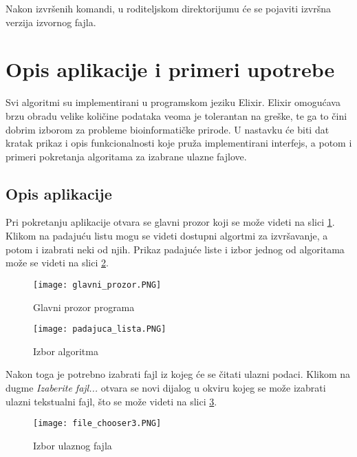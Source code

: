 \documentclass[12pt,oneside]{memoir}
\begin{document}
\noindent Nakon izvršenih komandi, u roditeljskom direktorijumu će se pojaviti izvršna verzija izvornog fajla.




\section{Opis aplikacije i primeri upotrebe}

Svi algoritmi su implementirani u programskom jeziku Elixir. Elixir omogućava brzu obradu velike količine podataka veoma je tolerantan na greške, te ga to čini dobrim izborom za probleme bioinformatičke prirode. U nastavku će biti dat kratak prikaz i opis funkcionalnosti koje pruža implementirani interfejs, a potom i primeri pokretanja algoritama za izabrane ulazne fajlove.

\subsection{Opis aplikacije}

Pri pokretanju aplikacije otvara se glavni prozor koji se može videti na slici \ref{fig:glavniProzor}. Klikom na padajuću listu mogu se videti dostupni algortmi za izvršavanje, a potom i izabrati neki od njih. Prikaz padajuće liste i izbor jednog od algoritama može se videti na slici \ref{fig:padajucaLista}. 

\begin{figure}[h]
\centering
\texttt{[image: glavni\_prozor.PNG]}
\caption{Glavni prozor programa}
\label{fig:glavniProzor}
\end{figure}

\begin{figure}[h]
\centering
\texttt{[image: padajuca\_lista.PNG]}
\caption{Izbor algoritma}
\label{fig:padajucaLista}
\end{figure}

Nakon toga je potrebno izabrati fajl iz kojeg će se čitati ulazni podaci. Klikom na dugme \textit{Izaberite fajl...} otvara se novi dijalog u okviru kojeg se može izabrati ulazni tekstualni fajl, što se može videti na slici \ref{fig:fileChooser}.

\begin{figure}[h]
\centering
\texttt{[image: file\_chooser3.PNG]}
\caption{Izbor ulaznog fajla}
\label{fig:fileChooser}
\end{figure}
\end{document}

